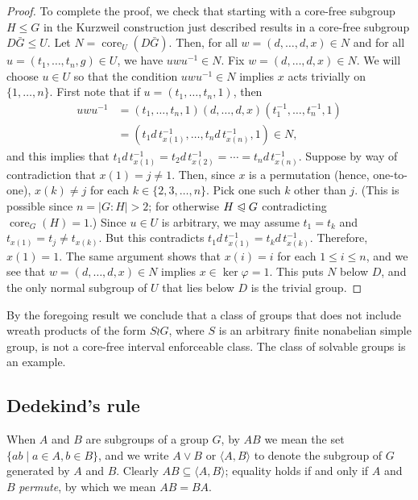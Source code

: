 \documentclass{gen-j-l}
\newcommand{\<}{\ensuremath{\langle}}
\renewcommand{\>}{\ensuremath{\rangle}}
\theoremstyle{plain}
\theoremstyle{definition}
\theoremstyle{remark}
\numberwithin{theorem}{section}
\numberwithin{claim}{section}
\numberwithin{equation}{section}
\numberwithin{conjecture}{section}
\renewcommand{\leq}{\ensuremath{\leqslant}}
\newcommand{\subnormal}{\ensuremath{\trianglelefteqslant}}
\newcommand{\join}{\ensuremath{\vee}}
\newcommand{\core}{\ensuremath{\operatorname{core}}}
\newcommand{\2}{\ensuremath{\mathbf{2}}}
\newcommand{\3}{\ensuremath{\mathbf{3}}}
\renewcommand{\phi}{\ensuremath{\varphi}}
\begin{document}
\begin{proof}
  To complete the proof, we check that starting with a core-free subgroup
  $H \leq G$ in the Kurzweil construction just described results in a
  core-free subgroup $D \bar{G} \leq U$.   Let $N = \core_U(D\bar{G})$.  Then, for all $w=(d,\dots, d, x) \in N$ and for all 
  $u = (t_1,\dots, t_n, g)\in U$, we have $u w u^{-1}\in N$. 
  Fix $w=(d,\dots, d, x) \in N$.  We will choose $u\in U$ so that
  the condition $u w u^{-1}\in N$ implies $x$ acts trivially on $\{1, \dots, n\}$.
  First note that if $u = (t_1,\dots, t_n, 1)$, then
  \begin{align*}
  u w u^{-1} &= (t_1,\dots, t_n, 1) (d, \dots, d, x) (t_1^{-1},\dots, t_n^{-1}, 1)\\
  &=(t_1 d \,t_{x(1)}^{-1},\dots, t_nd \,t_{x(n)}^{-1}, 1) \in N,
  \end{align*}
  and this implies that $t_1 d\, t_{x(1)}^{-1} = t_2 d\, t_{x(2)}^{-1} =\cdots = t_nd \,t_{x(n)}^{-1}$. 
  Suppose by way of contradiction that $x(1) = j\neq 1$.  Then, since $x$ is a
  permutation (hence, one-to-one), $x(k) \neq j$ for
  each $k\in \{2, 3, \dots, n\}$.  Pick one such $k$ other than $j$.
  (This is possible since $n = |G:H|>2$; for otherwise $H\subnormal G$
  contradicting $\core_G(H)=1$.) 
  Since $u \in U$ is arbitrary, we may assume
  $t_1 = t_k$ and $t_{x(1)}=t_j\neq t_{x(k)}$.  
  But this contradicts $t_1 d\, t_{x(1)}^{-1} = t_k d\, t_{x(k)}^{-1}$.
  Therefore, $x(1) = 1$.  The same argument shows that 
  $x(i) = i$ for each $1\leq i\leq n$, 
  and we see that
  $w=(d,\dots,d, x) \in N$ implies $x\in \ker \phi = 1$.  This puts $N$ below
  $D$, and the only normal subgroup of $U$ that lies 
  below $D$ is the trivial group.
\end{proof}
By the foregoing result we conclude that a class of groups that does
not include wreath products of the form $S\wr G$, where $S$ is an arbitrary
finite nonabelian simple group, is not a core-free interval enforceable class. 
The class of solvable groups is an example.





\subsection{Dedekind's rule}
\label{sec:dedekinds-rule}
When $A$ and $B$ are subgroups of a group $G$, by $AB$ we mean the set
$\{ a b \mid a\in A, b\in B\}$, and we write $A \join B$ or $\<A, B\>$ to denote
the subgroup of $G$ generated by $A$ and $B$.  
Clearly $AB \subseteq \<A,B\>$; 
equality holds if and only if $A$ and $B$ \emph{permute}, by which we mean $A B = B A$.
\end{document}
